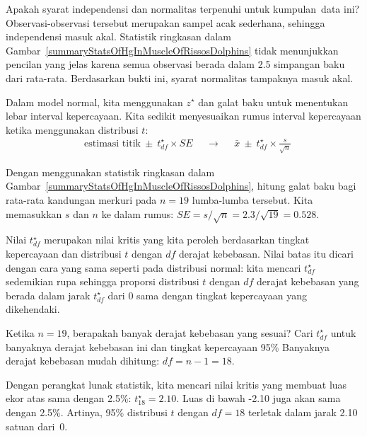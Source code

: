 \begin{examplewrap}
\begin{nexample}{Apakah syarat independensi dan
    normalitas terpenuhi untuk kumpulan~data ini?}
  Observasi-observasi tersebut merupakan sampel acak sederhana,
  sehingga independensi masuk akal.
  Statistik ringkasan dalam
  Gambar~\ref{summaryStatsOfHgInMuscleOfRissosDolphins}
  tidak menunjukkan pencilan yang jelas karena
  semua observasi berada dalam 2.5 simpangan baku
  dari rata-rata.
  Berdasarkan bukti ini, syarat normalitas
  tampaknya masuk akal.
\end{nexample}
\end{examplewrap}

Dalam model normal, kita menggunakan $z^{\star}$ dan galat baku untuk menentukan lebar interval kepercayaan. Kita sedikit menyesuaikan rumus interval kepercayaan ketika menggunakan distribusi $t$:
\begin{align*}
&\text{estimasi titik} \ \pm\  t^{\star}_{df} \times SE
&&\to
&&\bar{x} \ \pm\  t^{\star}_{df} \times \frac{s}{\sqrt{n}}
\end{align*}

\begin{examplewrap}
\begin{nexample}{Dengan menggunakan statistik ringkasan dalam
    Gambar~\ref{summaryStatsOfHgInMuscleOfRissosDolphins},
    hitung galat baku bagi rata-rata kandungan merkuri
    pada $n = 19$ lumba-lumba tersebut.}
  Kita memasukkan $s$ dan $n$ ke dalam rumus:
  $
  SE
    = s / \sqrt{n}
    = 2.3 / \sqrt{19}
    = 0.528
  $.
\end{nexample}
\end{examplewrap}

Nilai $t^{\star}_{df}$ merupakan nilai kritis yang kita peroleh berdasarkan
tingkat kepercayaan dan distribusi $t$ dengan $df$ derajat
kebebasan.
Nilai batas itu dicari dengan cara yang sama seperti pada distribusi
normal: kita mencari $t^{\star}_{df}$ sedemikian rupa sehingga
proporsi distribusi $t$ dengan $df$ derajat
kebebasan yang berada dalam jarak $t^{\star}_{df}$
dari 0 sama dengan tingkat kepercayaan yang dikehendaki.

\begin{examplewrap}
\begin{nexample}{Ketika $n = 19$, berapakah banyak
    derajat kebebasan yang sesuai?
    Cari $t^{\star}_{df}$ untuk banyaknya derajat kebebasan ini
    dan tingkat kepercayaan 95\%}
  Banyaknya derajat kebebasan mudah dihitung:
  $df = n - 1 = 18$.
  
  Dengan perangkat lunak statistik, kita mencari nilai kritis yang membuat
  luas ekor atas sama dengan 2.5\%:
  $t^{\star}_{18} = 2.10$.
  Luas di bawah -2.10 juga akan sama dengan 2.5\%.
  Artinya, 95\% distribusi $t$ dengan $df = 18$
  terletak dalam jarak 2.10 satuan dari~0.
\end{nexample}
\end{examplewrap}


